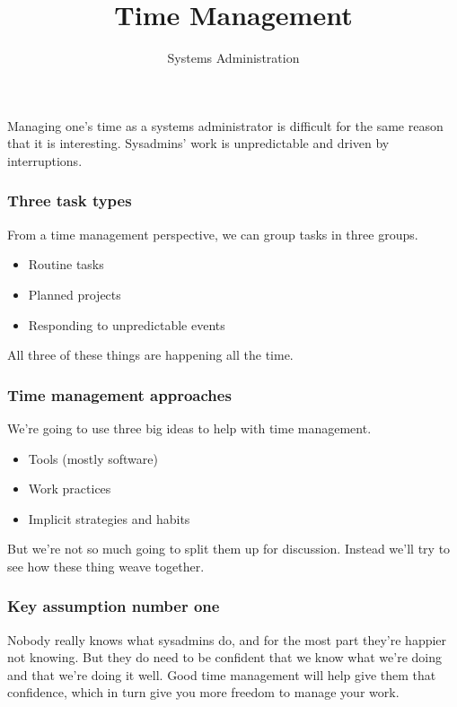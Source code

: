 \documentclass[10pt]{beamer}
\title{Time Management}
\author[IN719]{Systems Administration}
\institute[Otago Polytechnic]{
  Otago Polytechnic \\
  Dunedin, New Zealand \\
}
\date{}
\begin{document}
\begin{frame}[plain]
  \titlepage
\end{frame}

\begin{frame}
  \frametitle{}

   Managing one's time as a systems administrator is difficult for the same
   reason that it is interesting. Sysadmins' work is unpredictable and 
   driven by interruptions.
\end{frame}

\begin{frame}
  \frametitle{Three task types}

  From a time management perspective, we can group tasks in three groups.
  
  \begin{itemize}
  \item Routine tasks
  \item Planned projects
  \item Responding to unpredictable events
  \end{itemize}
  
  All three of these things are happening all the time.

\end{frame}

\begin{frame}
  \frametitle{Time management approaches}

  We're going to use three big ideas to help with time management.
  
  \begin{itemize}
    \item Tools (mostly software)
    \item Work practices
    \item Implicit strategies and habits
  \end{itemize}
  
  But we're not so much going to split them up for discussion. Instead
  we'll try to see how these thing weave together.
  
\end{frame}


\begin{frame}
  \frametitle{Key assumption number one}

  Nobody really knows what sysadmins do, and for the most part they're happier 
  not knowing. But they do need to be confident that we know what we're doing and
  that we're doing it well. Good time management will help give them that confidence, 
  which in turn give you more freedom to manage your work.
    
\end{frame}
\end{document}
